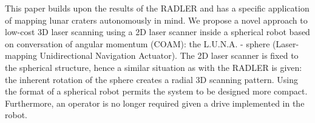 This paper builds upon the results of the RADLER and has a specific application of mapping lunar craters autonomously in mind.
We propose a novel approach to low-cost 3D laser scanning using a 2D laser scanner inside a spherical robot based on conversation of angular momentum (COAM): the L.U.N.A. - sphere (Laser-mapping Unidirectional Navigation Actuator).
The 2D laser scanner is fixed to the spherical structure, hence a similar situation as with the RADLER is given: the inherent rotation of the sphere creates a radial 3D scanning pattern.
Using the format of a spherical robot permits the system to be designed more compact.
Furthermore, an operator is no longer required given a drive implemented in the robot.
